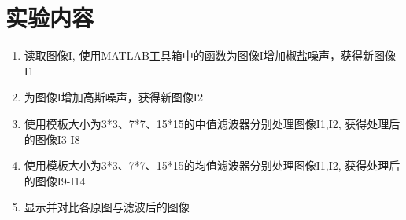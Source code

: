 \documentclass[a4paper]{ctexart}
\begin{document}
  \section{实验内容}
  \begin{enumerate}
    \item 读取图像I, 使用MATLAB工具箱中的函数为图像I增加椒盐噪声，获得新图像I1
    \item 为图像I增加高斯噪声，获得新图像I2
    \item 使用模板大小为3*3、7*7、15*15的中值滤波器分别处理图像I1,I2, 获得处理后的图像I3-I8
    \item 使用模板大小为3*3、7*7、15*15的均值滤波器分别处理图像I1,I2, 获得处理后的图像I9-I14
    \item 显示并对比各原图与滤波后的图像
  \end{enumerate}
\end{document}
